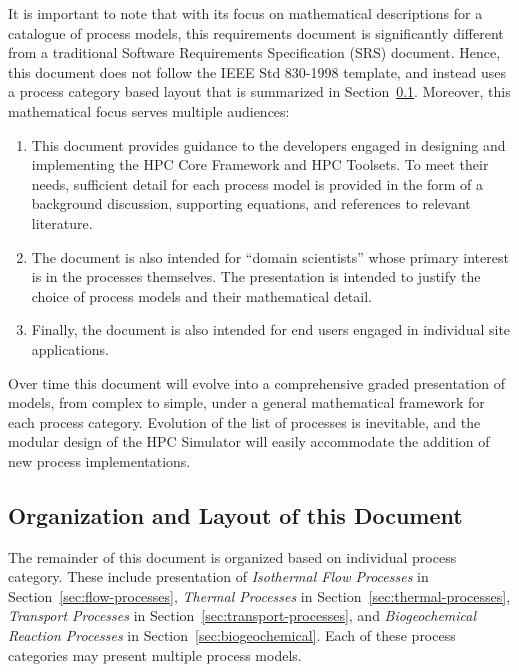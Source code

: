 It is important to note that with its focus on mathematical
descriptions for a catalogue of process models, this requirements
document is significantly different from a traditional Software
Requirements Specification (SRS) document.  Hence, this document does
not follow the IEEE Std 830-1998 template, and instead uses a process
category based layout that is summarized in Section~\ref{sec:layout}.
Moreover, this mathematical focus serves multiple audiences:
%
\begin{enumerate}
\item 
  This document provides guidance to the developers engaged in
  designing and implementing the HPC Core Framework and HPC Toolsets.
  To meet their needs, sufficient detail for each process model is
  provided in the form of a background discussion, supporting equations, 
  and references to relevant literature.  
\item 
  The document is also intended for ``domain scientists'' whose
  primary interest is in the processes themselves.  The presentation
  is intended to justify the choice of process models and their
  mathematical detail.
\item 
  Finally, the document is also intended for end users engaged in
  individual site applications.
\end{enumerate}
%
Over time this document will evolve into a comprehensive graded
presentation of models, from complex to simple, under a general
mathematical framework for each process category.  
%
Evolution of the list of processes is inevitable, and the modular
design of the HPC Simulator will easily accommodate the addition of
new process implementations. 



\subsection{Organization and Layout of this Document}
\label{sec:layout}

The remainder of this document is organized based on individual process category.
These include presentation of
\emph{Isothermal Flow Processes} in Section~\ref{sec:flow-processes}, 
\emph{Thermal Processes} in Section~\ref{sec:thermal-processes},
\emph{Transport Processes} in Section~\ref{sec:transport-processes}, and 
\emph{Biogeochemical Reaction Processes} in Section~\ref{sec:biogeochemical}. 
%
Each of these process categories may present multiple process models.  


